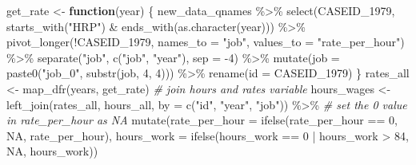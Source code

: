 \documentclass{article}
\newenvironment{Shaded}{\begin{snugshade}}{\end{snugshade}}
\newcommand{\AttributeTok}[1]{\textcolor[rgb]{0.77,0.63,0.00}{#1}}
\newcommand{\CommentTok}[1]{\textcolor[rgb]{0.56,0.35,0.01}{\textit{#1}}}
\newcommand{\ConstantTok}[1]{\textcolor[rgb]{0.00,0.00,0.00}{#1}}
\newcommand{\ControlFlowTok}[1]{\textcolor[rgb]{0.13,0.29,0.53}{\textbf{#1}}}
\newcommand{\DecValTok}[1]{\textcolor[rgb]{0.00,0.00,0.81}{#1}}
\newcommand{\FunctionTok}[1]{\textcolor[rgb]{0.00,0.00,0.00}{#1}}
\newcommand{\NormalTok}[1]{#1}
\newcommand{\OtherTok}[1]{\textcolor[rgb]{0.56,0.35,0.01}{#1}}
\newcommand{\SpecialCharTok}[1]{\textcolor[rgb]{0.00,0.00,0.00}{#1}}
\newcommand{\StringTok}[1]{\textcolor[rgb]{0.31,0.60,0.02}{#1}}
\begin{document}
\begin{Shaded}
\begin{Highlighting}[]
\NormalTok{get\_rate }\OtherTok{\textless{}{-}} \ControlFlowTok{function}\NormalTok{(year) \{}
\NormalTok{  new\_data\_qnames }\SpecialCharTok{\%\textgreater{}\%}
    \FunctionTok{select}\NormalTok{(CASEID\_1979,}
                  \FunctionTok{starts\_with}\NormalTok{(}\StringTok{"HRP"}\NormalTok{) }\SpecialCharTok{\&}
                    \FunctionTok{ends\_with}\NormalTok{(}\FunctionTok{as.character}\NormalTok{(year))) }\SpecialCharTok{\%\textgreater{}\%}
    \FunctionTok{pivot\_longer}\NormalTok{(}\SpecialCharTok{!}\NormalTok{CASEID\_1979, }\AttributeTok{names\_to =} \StringTok{"job"}\NormalTok{, }\AttributeTok{values\_to =} \StringTok{"rate\_per\_hour"}\NormalTok{) }\SpecialCharTok{\%\textgreater{}\%}
    \FunctionTok{separate}\NormalTok{(}\StringTok{"job"}\NormalTok{, }\FunctionTok{c}\NormalTok{(}\StringTok{"job"}\NormalTok{, }\StringTok{"year"}\NormalTok{), }\AttributeTok{sep =} \SpecialCharTok{{-}}\DecValTok{4}\NormalTok{) }\SpecialCharTok{\%\textgreater{}\%}
    \FunctionTok{mutate}\NormalTok{(}\AttributeTok{job =} \FunctionTok{paste0}\NormalTok{(}\StringTok{"job\_0"}\NormalTok{, }\FunctionTok{substr}\NormalTok{(job, }\DecValTok{4}\NormalTok{, }\DecValTok{4}\NormalTok{))) }\SpecialCharTok{\%\textgreater{}\%}
    \FunctionTok{rename}\NormalTok{(}\AttributeTok{id =}\NormalTok{ CASEID\_1979)}
\NormalTok{\}}
\NormalTok{rates\_all }\OtherTok{\textless{}{-}} \FunctionTok{map\_dfr}\NormalTok{(years, get\_rate)}
\CommentTok{\# join hours and rates variable}
\NormalTok{hours\_wages }\OtherTok{\textless{}{-}} \FunctionTok{left\_join}\NormalTok{(rates\_all,}
\NormalTok{                         hours\_all,}
                         \AttributeTok{by =} \FunctionTok{c}\NormalTok{(}\StringTok{"id"}\NormalTok{, }\StringTok{"year"}\NormalTok{, }\StringTok{"job"}\NormalTok{)) }\SpecialCharTok{\%\textgreater{}\%}
  \CommentTok{\# set the 0 value in rate\_per\_hour as NA}
  \FunctionTok{mutate}\NormalTok{(}\AttributeTok{rate\_per\_hour =} \FunctionTok{ifelse}\NormalTok{(rate\_per\_hour }\SpecialCharTok{==} \DecValTok{0}\NormalTok{, }\ConstantTok{NA}\NormalTok{,}
\NormalTok{                                rate\_per\_hour),}
         \AttributeTok{hours\_work =} \FunctionTok{ifelse}\NormalTok{(hours\_work }\SpecialCharTok{==} \DecValTok{0} \SpecialCharTok{|}\NormalTok{ hours\_work }\SpecialCharTok{\textgreater{}} \DecValTok{84}\NormalTok{, }\ConstantTok{NA}\NormalTok{, hours\_work))}
\end{Highlighting}
\end{Shaded}
\end{document}
